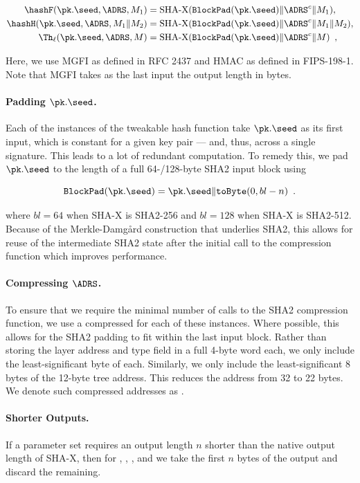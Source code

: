\begin{align*}
    \hashF(\pk.\seed, \ADRS, M_1) &= \text{SHA-X}(\mathtt{BlockPad}(\pk.\seed) \| \ADRS^c \| M_{1} ), \\
    \hashH(\pk.\seed, \ADRS, M_1 \| M_2) &= \text{SHA-X}(\mathtt{BlockPad}(\pk.\seed) \| \ADRS^c \| M_1 \| M_2 ), \\
    \Th_\ell (\pk.\seed, \ADRS, M) &= \text{SHA-X}(\mathtt{BlockPad}(\pk.\seed) \| \ADRS^c \| M) \enspace,
\end{align*}

Here, we use MGFI as defined in RFC 2437 and HMAC as defined in FIPS-198-1. Note that MGFI takes as the last input the output length in bytes.
 

\paragraph{Padding $\pk.\seed$.} 
Each of the instances of the tweakable hash function take $\pk.\seed$ as its first input, which is constant for a given key pair --- and, thus, across a single signature. This leads to a lot of redundant computation. To remedy this, we pad $\pk.\seed$ to the length of a full 64-/128-byte SHA2 input block using

\[
    \mathtt{BlockPad}(\pk.\seed) =\pk.\seed \| \mathtt{toByte} (0, bl-n) \enspace.
\]

where $bl=64$ when SHA-X is SHA2-256 and $bl=128$ when SHA-X is SHA2-512. Because of the Merkle-Damgård construction that underlies SHA2, this allows for reuse of the intermediate SHA2 state after the initial call to the compression function which improves performance.

\paragraph{Compressing $\ADRS$.} 
To ensure that we require the minimal number of calls to the SHA2 compression function, we use a compressed \ADRS for each of these instances. Where possible, this allows for the SHA2 padding to fit within the last input block. Rather than storing the layer address and type field in a full 4-byte word each, we only include the least-significant byte of each. Similarly, we only include the least-significant 8 bytes of the 12-byte tree address. This reduces the address from 32 to 22 bytes. We denote such compressed addresses as \ADRS.

\paragraph{Shorter Outputs.}
If a parameter set requires an output length $n$ shorter than the native output length of SHA-X, then for \hashF, \hashH, \PRF, and \PRFmsg we take the first $n$ bytes of the output and discard the remaining.

